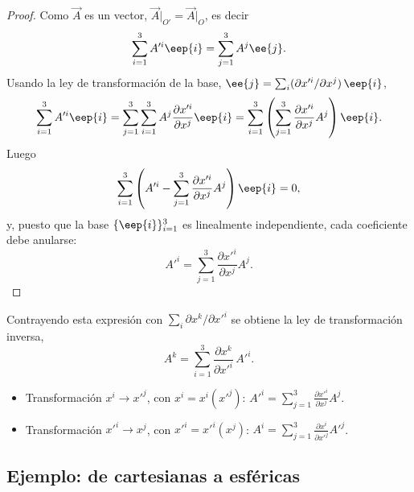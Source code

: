 \begin{proof}
Como $\vec A$ es un vector, $\vec A\big|_{O'} = \vec A\big|_{O}$, es decir
\begin{equation}
\sum_{i=1}^{3} A'^i \eep{i} = \sum_{j=1}^{3} A^j \ee{j} .
\end{equation}
Usando la ley de transformación de la base, $\ee{j}=\sum_i (\partial x'^i/\partial x^j)\,\eep{i}$,
\begin{equation}
\sum_{i=1}^{3} A'^i \eep{i} = \sum_{j=1}^3\sum_{i=1}^3 A^j \frac{\partial x'^i}{\partial x^j}\eep{i}
= \sum_{i=1}^3\left(\sum_{j=1}^3 \frac{\partial x'^i}{\partial x^j}A^j\right)\eep{i} .
\end{equation}
Luego
\begin{equation}
\sum_{i=1}^{3}\left(A'^i - \sum_{j=1}^3 \frac{\partial x'^i}{\partial x^j}A^j \right)\eep{i} = 0 ,
\end{equation}
y, puesto que la base $\{\eep{i}\}_{i=1}^3$ es linealmente independiente, cada coeficiente debe anularse:
\begin{equation}
A'^i = \sum_{j=1}^{3}\frac{\partial x'^i}{\partial x^j}A^j .
\end{equation}
\end{proof}

Contrayendo esta expresión con $\sum_i \partial x^k/\partial x'^i$ se obtiene la ley de transformación inversa,
\begin{equation}
A^k = \sum_{i=1}^{3}\frac{\partial x^k}{\partial x'^i}\, A'^i .
\end{equation}

\begin{observacion}[Resumen]
\begin{itemize}
\item Transformación $x^i\to x'^j$, con $x^i=x^i(x'^j)$: \quad $\displaystyle A'^i = \sum_{j=1}^3 \frac{\partial x'^i}{\partial x^j}A^j$.
\item Transformación $x'^i\to x^j$, con $x'^i=x'^i(x^j)$: \quad $\displaystyle A^i = \sum_{j=1}^3 \frac{\partial x^i}{\partial x'^j}A'^j$.
\end{itemize}
\end{observacion}

\subsection{Ejemplo: de cartesianas a esféricas}

